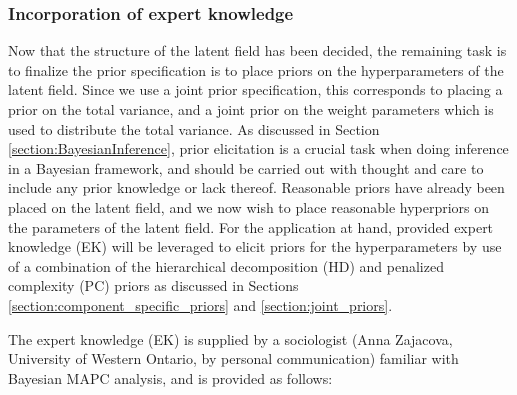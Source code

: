 \subsubsection{Incorporation of expert knowledge}
\label{section:application1:priorspecification}
Now that the structure of the latent field has been decided, the remaining task is to finalize the prior specification is to place priors on the hyperparameters of the latent field. Since we use a joint prior specification, this corresponds to placing a prior on the total variance, and a joint prior on the weight parameters which is used to distribute the total variance. As discussed in Section \ref{section:BayesianInference}, prior elicitation is a crucial task when doing inference in a Bayesian framework, and should be carried out with thought and care to include any prior knowledge or lack thereof. Reasonable priors have already been placed on the latent field, and we now wish to place reasonable hyperpriors on the parameters of the latent field. For the application at hand, provided expert knowledge (EK) will be leveraged to elicit priors for the hyperparameters by use of a combination of the hierarchical decomposition (HD) and penalized complexity (PC) priors as discussed in Sections \ref{section:component_specific_priors} and \ref{section:joint_priors}.

The expert knowledge (EK) is supplied by a sociologist (Anna Zajacova, University of Western Ontario, by personal communication) familiar with Bayesian MAPC analysis, and is provided as follows:

